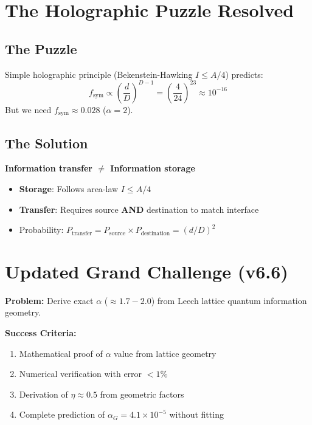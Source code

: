 \documentclass[12pt]{article}
\begin{document}
\section{The Holographic Puzzle Resolved}

\subsection{The Puzzle}
Simple holographic principle (Bekenstein-Hawking $I \leq A/4$) predicts:
\[
f_{\text{sym}} \propto \left(\frac{d}{D}\right)^{D-1} = \left(\frac{4}{24}\right)^{23} \approx 10^{-16}
\]
But we need $f_{\text{sym}} \approx 0.028$ ($\alpha=2$).

\subsection{The Solution}
\begin{tcolorbox}[colback=green!5!white,colframe=green!75!black]
\textbf{Information transfer $\neq$ Information storage}

\begin{itemize}
\item \textbf{Storage}: Follows area-law $I \leq A/4$
\item \textbf{Transfer}: Requires source \textbf{AND} destination to match interface
\item Probability: $P_{\text{transfer}} = P_{\text{source}} \times P_{\text{destination}} = (d/D)^2$
\end{itemize}
\end{tcolorbox}

\section{Updated Grand Challenge (v6.6)}

\textbf{Problem:} Derive exact $\alpha$ ($\approx 1.7-2.0$) from Leech lattice quantum information geometry.

\textbf{Success Criteria:}
\begin{enumerate}
\item Mathematical proof of $\alpha$ value from lattice geometry
\item Numerical verification with error $<1\%$
\item Derivation of $\eta \approx 0.5$ from geometric factors
\item Complete prediction of $\alpha_G = 4.1\times10^{-5}$ without fitting
\end{enumerate}
\end{document}
